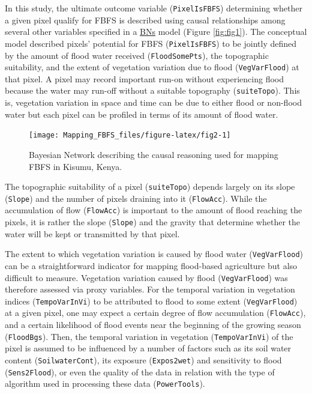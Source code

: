 \documentclass[12pt,oneside]{article}
\begin{document}
In this study, the ultimate outcome variable (\texttt{PixelIsFBFS}) determining whether a given pixel qualify for FBFS is described using causal relationships among several other variables specified in a \href{https://en.wikipedia.org/wiki/Bayesian_network}{BNs} model (Figure \ref{fig:fig1}). The conceptual model described pixels' potential for FBFS (\texttt{PixelIsFBFS}) to be jointly defined by the amount of flood water received (\texttt{FloodSomePts}), the topographic suitability, and the extent of vegetation variation due to flood (\texttt{VegVarFlood}) at that pixel. A pixel may record important run-on without experiencing flood because the water may run-off without a suitable topography (\texttt{suiteTopo}). This is, vegetation variation in space and time can be due to either flood or non-flood water but each pixel can be profiled in terms of its amount of flood water.

\begin{figure}[!htbp]

{\centering \texttt{[image: Mapping\_FBFS\_files/figure-latex/fig2-1]} 

}

\caption{Bayesian Network describing the causal reasoning used for mapping FBFS in Kisumu, Kenya.}\label{fig:fig2}
\end{figure}

The topographic suitability of a pixel (\texttt{suiteTopo}) depends largely on its slope (\texttt{Slope}) and the number of pixels draining into it (\texttt{FlowAcc}). While the accumulation of flow (\texttt{FlowAcc}) is important to the amount of flood reaching the pixels, it is rather the slope (\texttt{Slope}) and the gravity that determine whether the water will be kept or transmitted by that pixel.

The extent to which vegetation variation is caused by flood water (\texttt{VegVarFlood}) can be a straightforward indicator for mapping flood-based agriculture but also difficult to measure. Vegetation variation caused by flood (\texttt{VegVarFlood}) was therefore assessed via proxy variables. For the temporal variation in vegetation indices (\texttt{TempoVarInVi}) to be attributed to flood to some extent (\texttt{VegVarFlood}) at a given pixel, one may expect a certain degree of flow accumulation (\texttt{FlowAcc}), and a certain likelihood of flood events near the beginning of the growing season (\texttt{FloodBgs}). Then, the temporal variation in vegetation (\texttt{TempoVarInVi}) of the pixel is assumed to be influenced by a number of factors such as its soil water content (\texttt{SoilwaterCont}), its exposure (\texttt{Expos2wet}) and sensitivity to flood (\texttt{Sens2Flood}), or even the quality of the data in relation with the type of algorithm used in processing these data (\texttt{PowerTools}).
\end{document}
